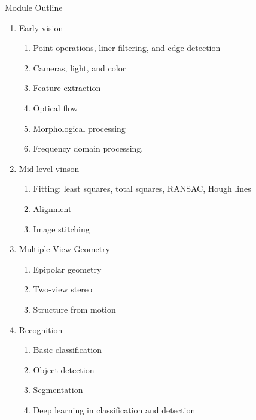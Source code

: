 \begin{frame}{Module Outline}
    \begin{enumerate}
        \item Early vision
            \begin{enumerate}
                \item Point operations, liner filtering, and edge detection
                \item Cameras, light, and color
                \item Feature extraction
                \item Optical flow
                \item Morphological processing
                \item Frequency domain processing.
            \end{enumerate}
        \item Mid-level vinson
            \begin{enumerate}
                \item Fitting: least squares, total squares, RANSAC, Hough lines
                \item Alignment
                \item Image stitching
            \end{enumerate}
        \item Multiple-View Geometry
            \begin{enumerate}
                \item Epipolar geometry
                \item Two-view stereo
                \item Structure from motion
            \end{enumerate}
        \item Recognition
            \begin{enumerate}
                \item Basic classification
                 \item Object detection
                 \item Segmentation
                 \item Deep learning in classification and detection
            \end{enumerate}
    \end{enumerate}
\end{frame}
